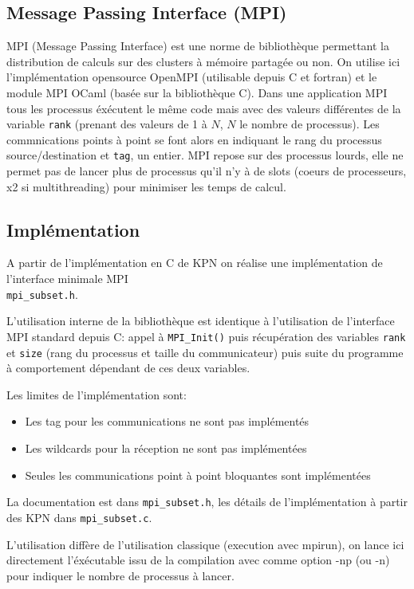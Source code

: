 \documentclass[a4paper]{article}
\begin{document}
\subsection{Message Passing Interface (MPI)}

MPI (Message Passing Interface) est une norme de bibliothèque permettant la distribution de calculs sur des clusters à mémoire partagée ou non. On utilise ici l'implémentation opensource OpenMPI (utilisable depuis C et fortran) et le module MPI OCaml (basée sur la bibliothèque C). Dans une application MPI tous les processus éxécutent le même code mais avec des valeurs différentes de la variable \verb|rank| (prenant des valeurs de 1 à $N$, $N$ le nombre de processus). Les commnications points à point se font alors en indiquant le rang du processus source/destination et \verb|tag|, un entier. MPI repose sur des processus lourds, elle ne permet pas de lancer plus de processus qu'il n'y à de slots (coeurs de processeurs, x2 si multithreading) pour minimiser les temps de calcul.

\subsection{Implémentation}

A partir de l'implémentation en C de KPN on réalise une implémentation de l'interface minimale MPI \\\verb|mpi_subset.h|.

L'utilisation interne de la bibliothèque est identique à l'utilisation de l'interface MPI standard depuis C: appel à \texttt{MPI\_Init()} puis récupération des variables \texttt{rank} et \texttt{size} (rang du processus et taille du communicateur) puis suite du programme à comportement dépendant de ces deux variables.

Les limites de l'implémentation sont:
\begin{itemize}
    \item Les tag pour les communications ne sont pas implémentés
    \item Les wildcards pour la réception ne sont pas implémentées
    \item Seules les communications point à point bloquantes sont implémentées
\end{itemize}

La documentation est dans \verb|mpi_subset.h|, les détails de l'implémentation à partir des KPN dans \verb|mpi_subset.c|.

L'utilisation diffère de l'utilisation classique (execution avec mpirun), on lance ici directement l'éxécutable issu de la compilation avec comme option -np (ou -n) pour indiquer le nombre de processus à lancer.
\end{document}

